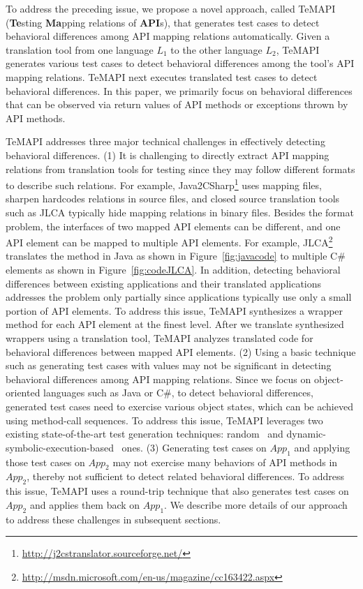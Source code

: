 To address the preceding issue, we propose a novel approach, called TeMAPI (\textbf{Te}sting \textbf{Ma}pping relations of \textbf{API}s), that generates test cases to detect behavioral differences among API mapping relations automatically. Given a translation tool from one language $L_1$ to the other language $L_2$, TeMAPI generates various test cases to detect behavioral differences among the tool's API mapping relations. TeMAPI next executes translated test cases to detect behavioral differences. In this paper, we primarily focus on behavioral differences that can be observed via return values of API methods or exceptions thrown by API methods.

TeMAPI addresses three major technical challenges in effectively detecting behavioral differences. (1) It is challenging to directly extract API mapping relations from translation tools for testing since they may follow different formats to describe such relations. For example, Java2CSharp\footnote{\url{http://j2cstranslator.sourceforge.net/}} uses mapping files, sharpen hardcodes relations in source files, and closed source translation tools such as JLCA typically hide mapping relations in binary files. Besides the format problem, the interfaces of two mapped API elements can be different, and one API element can be mapped to multiple API elements. For example, JLCA\footnote{\url{http://msdn.microsoft.com/en-us/magazine/cc163422.aspx}} translates the  method in Java as shown in Figure~\ref{fig:javacode} to multiple C\# elements as shown in Figure~\ref{fig:codeJLCA}. In addition, detecting behavioral differences between existing applications and their translated applications addresses the problem only partially since applications typically use only a small portion of API elements. To address this issue, TeMAPI synthesizes a wrapper method for each API element at the finest level. After we translate synthesized wrappers using a translation tool, TeMAPI analyzes translated code for behavioral differences between mapped API elements. (2) Using a basic technique such as generating test cases with  values may not be significant in detecting behavioral differences among API mapping relations. Since we focus on object-oriented languages such as Java or C\#, to detect behavioral differences, generated test cases need to exercise various object states, which can be achieved using method-call sequences. To address this issue, TeMAPI leverages two existing state-of-the-art test generation techniques: random~\cite{pacheco2007feedback} and dynamic-symbolic-execution-based~\cite{koushik:cute, godefroid:dart, tillmann2008pex} ones. (3) Generating test cases on $App_1$ and applying those test cases on $App_2$ may not exercise many behaviors of API methods in $App_2$, thereby not sufficient to detect related behavioral differences. To address this issue, TeMAPI uses a round-trip technique that also generates test cases on $App_2$ and applies them back on $App_1$. We describe more details of our approach to address these challenges in subsequent sections.

